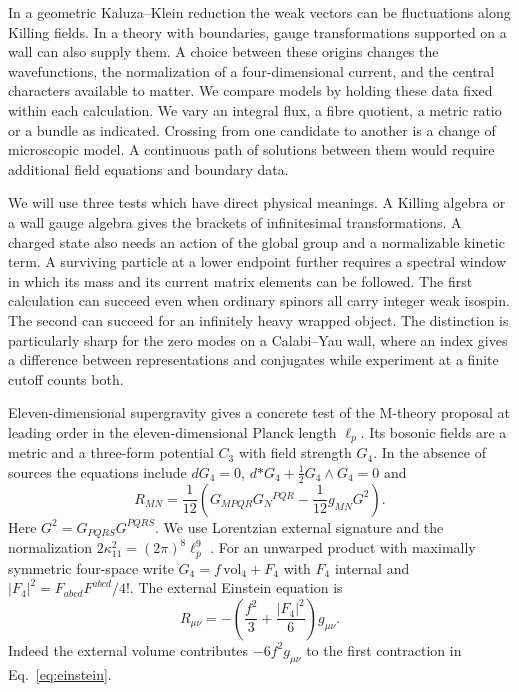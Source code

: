 \documentclass[aps,prd,reprint,onecolumn,nofootinbib,amsmath,amssymb]{revtex4-2}
\begin{document}
In a geometric Kaluza--Klein reduction the weak vectors can be fluctuations along Killing fields. In a theory with boundaries, gauge transformations supported on a wall can also supply them. A choice between these origins changes the wavefunctions, the normalization of a four-dimensional current, and the central characters available to matter. We compare models by holding these data fixed within each calculation. We vary an integral flux, a fibre quotient, a metric ratio or a bundle as indicated. Crossing from one candidate to another is a change of microscopic model. A continuous path of solutions between them would require additional field equations and boundary data.

We will use three tests which have direct physical meanings. A Killing algebra or a wall gauge algebra gives the brackets of infinitesimal transformations. A charged state also needs an action of the global group and a normalizable kinetic term. A surviving particle at a lower endpoint further requires a spectral window in which its mass and its current matrix elements can be followed. The first calculation can succeed even when ordinary spinors all carry integer weak isospin. The second can succeed for an infinitely heavy wrapped object. The distinction is particularly sharp for the zero modes on a Calabi--Yau wall, where an index gives a difference between representations and conjugates while experiment at a finite cutoff counts both.

Eleven-dimensional supergravity gives a concrete test of the M-theory proposal at leading order in the eleven-dimensional Planck length $\ell_p$. Its bosonic fields are a metric and a three-form potential $C_3$ with field strength $G_4$. In the absence of sources the equations include $dG_4=0$, $d{*G_4}+\tfrac12G_4\wedge G_4=0$ and
\begin{equation}
 R_{MN}=\frac1{12}\left(G_{MPQR}G_N{}^{PQR}
             -\frac1{12}g_{MN}G^2\right).
 \label{eq:einstein}
\end{equation}
Here $G^2=G_{PQRS}G^{PQRS}$. We use Lorentzian external signature and the normalization $2\kappa_{11}^2=(2\pi)^8\ell_p^9$ \cite{CJS1978,DNP1986}. For an unwarped product with maximally symmetric four-space write $G_4=f\,\mathrm{vol}_4+F_4$ with $F_4$ internal and $|F_4|^2=F_{abcd}F^{abcd}/4!$. The external Einstein equation is
\begin{equation}
 R_{\mu\nu}=-\left(\frac{f^2}{3}+\frac{|F_4|^2}{6}\right)g_{\mu\nu}.
 \label{eq:external}
\end{equation}
Indeed the external volume contributes $-6f^2g_{\mu\nu}$ to the first contraction in Eq.~\eqref{eq:einstein}.
\end{document}
